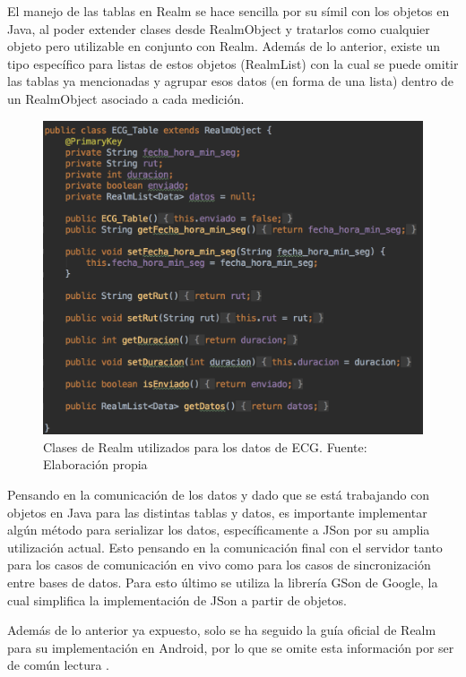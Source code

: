 El manejo de las tablas en Realm se hace sencilla por su símil con los objetos en Java, al poder extender clases desde RealmObject y tratarlos como cualquier objeto pero utilizable en conjunto con Realm. Además de lo anterior, existe un tipo específico para listas de estos objetos (RealmList) con la cual se puede omitir las tablas ya mencionadas y agrupar esos datos (en forma de una lista) dentro de un RealmObject asociado a cada medición.

\begin{figure}[H]
	\centering
	\includegraphics[scale=0.6]{figuras/protof/realmobject.png}
	\caption{Clases de Realm utilizados para los datos de ECG. Fuente: Elaboración propia}
	\label{realm_ecg}
\end{figure}

Pensando en la comunicación de los datos y dado que se está trabajando con objetos en Java para las distintas tablas y datos, es importante implementar algún método para serializar los datos, específicamente a JSon por su amplia utilización actual. Esto pensando en la comunicación final con el servidor tanto para los casos de comunicación en vivo como para los casos de sincronización entre bases de datos. Para esto último se utiliza la librería GSon de Google, la cual simplifica la implementación de JSon a partir de objetos.

Además de lo anterior ya expuesto, solo se ha seguido la guía oficial de Realm para su implementación en Android, por lo que se omite esta información por ser de común lectura \cite{realm_android}.


